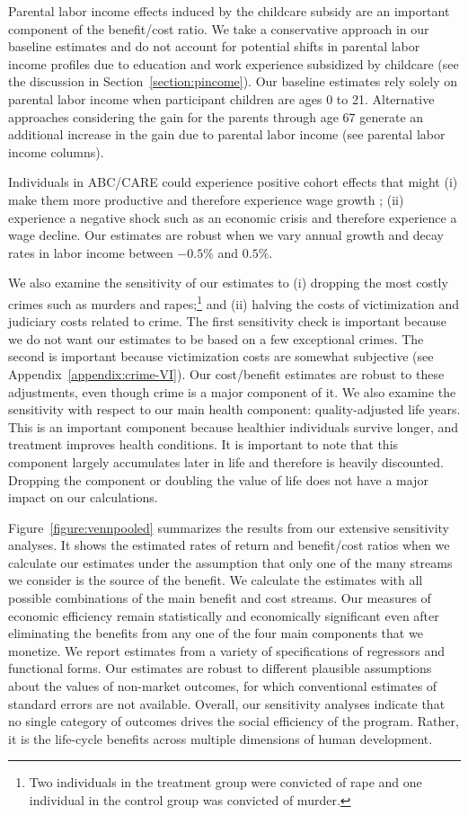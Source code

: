 Parental labor income effects induced by the childcare subsidy are an important component of the benefit/cost ratio. We take a conservative approach in our baseline estimates and do not account for potential shifts in parental labor income profiles due to education and work experience subsidized by childcare (see the discussion in Section~\ref{section:pincome}). Our baseline estimates rely solely on parental labor income when participant children are ages 0 to 21. Alternative approaches considering the gain for the parents through age 67 generate an additional increase in the gain due to parental labor income (see parental labor income columns).

Individuals in ABC/CARE could experience positive cohort effects that might (i) make them more productive and therefore experience wage growth \citep{Lagakos_Moll_etal_2016_LifeCycle_NBER}; (ii) experience a negative shock such as an economic crisis and therefore experience a wage decline. Our estimates are robust when we vary annual growth and decay rates in labor income between $-0.5\%$ and $0.5\%$.

We also examine the sensitivity of our estimates to (i) dropping the most costly crimes such as murders and rapes;\footnote{Two individuals in the treatment group were convicted of rape and one individual in the control group was convicted of murder.} and (ii) halving the costs of victimization and judiciary costs related to crime. The first sensitivity check is important because we do not want our estimates to be based on a few exceptional crimes. The second is important because victimization costs are somewhat subjective (see  Appendix~\ref{appendix:crime-VI}). Our cost/benefit estimates are robust to these adjustments, even though crime is a major component of it. We also examine the sensitivity with respect to our main health component: quality-adjusted life years. This is an important component because healthier individuals survive longer, and treatment improves health conditions. It is important to note that this component largely accumulates later in life and therefore is heavily discounted. Dropping the component or doubling the value of life does not have a major impact on our calculations.

Figure~\ref{figure:vennpooled} summarizes the results from our extensive sensitivity analyses. It shows the estimated rates of return and benefit/cost ratios when we calculate our estimates under the assumption that only one of the many streams we consider is the source of the benefit. We calculate the estimates with all possible combinations of the main benefit and cost streams. Our measures of economic efficiency remain statistically and economically significant even after eliminating the benefits from any one of the four main components that we monetize. We report estimates from a variety of specifications of regressors and functional forms. Our estimates are robust to different plausible assumptions about the values of non-market outcomes, for which conventional estimates of standard errors are not available. Overall, our sensitivity analyses indicate that no single category of outcomes drives the social efficiency of the program. Rather, it is the life-cycle benefits across multiple dimensions of human development.

